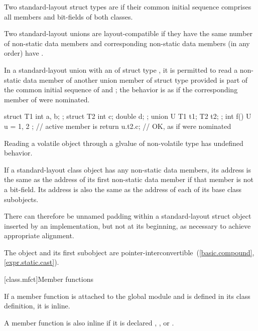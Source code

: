 \pnum
Two standard-layout struct types are
 if
their common initial sequence comprises all members and bit-fields of
both classes.

\pnum
Two standard-layout unions are layout-compatible if they
have the same number of non-static data members and corresponding
non-static data members (in any order) have .

\pnum
In a standard-layout union with an 
of struct type , it is permitted to read a non-static
data member  of another union member of struct type 
provided  is part of the common initial sequence of  and ;
the behavior is as if the corresponding member of  were nominated.
\begin{example}
\begin{codeblock}
struct T1 { int a, b; };
struct T2 { int c; double d; };
union U { T1 t1; T2 t2; };
int f() {
  U u = { { 1, 2 } };   // active member is 
  return u.t2.c;        // OK, as if  were nominated
}
\end{codeblock}
\end{example}
\begin{note}
Reading a volatile object through a glvalue of non-volatile type has
undefined behavior.
\end{note}

\pnum
If a standard-layout class object has any non-static data members, its address
is the same as the address of its first non-static data member
if that member is not a bit-field. Its
address is also the same as the address of each of its base class subobjects.
\begin{note}
There can therefore be unnamed padding within a standard-layout struct object
inserted by an implementation, but
not at its beginning, as necessary to achieve appropriate alignment.
\end{note}
\begin{note}
The object and its first subobject are
pointer-interconvertible~(\ref{basic.compound}, \ref{expr.static.cast}).
\end{note}

[class.mfct]{Member functions}%

\pnum
{}%
%
If a member function is attached to the global module and is defined in its class definition,
it is inline.
\begin{note}
A member function is also inline if it is declared
, , or .
\end{note}

